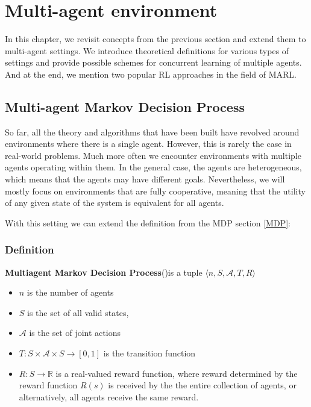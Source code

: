 \chapter{Multi-agent environment}

In this chapter, we revisit concepts from the previous section and extend them to multi-agent settings.
We introduce theoretical definitions for various types of settings and provide possible schemes for concurrent learning of multiple agents.
And at the end, we mention two popular RL approaches in the field of MARL.

\section{Multi-agent Markov Decision Process}
So far, all the theory and algorithms that have been built have revolved around environments where there is a single agent.
However, this is rarely the case in real-world problems.
Much more often we encounter environments with multiple agents operating within them.
In the general case, the agents are heterogeneous, which means that the agents may have different goals.
Nevertheless, we will mostly focus on environments that are fully cooperative, meaning that the utility of any given state of the system is equivalent for all agents.

With this setting we can extend the definition from the MDP section \ref{MDP}:
\subsection*{Definition}
\textbf{Multiagent Markov Decision Process}(\cite{MMDP})is a tuple 
$\langle n, S, \mathcal{A}, T, R\rangle$
\begin{itemize}
    \item $n$ is the number of agents
    \item $S$ is the set of all valid states,
    \item $\mathcal{A} $ is the set of joint actions
    \item $T: S \times \mathcal{A} \times S \rightarrow [0,1]$ is the transition function
    \item $R: S  \rightarrow \mathbb{R}$ is a real-valued reward function, where reward determined by the reward function $R(s)$ is received by the the entire collection of agents, or alternatively, all agents receive the same reward.

\end{itemize}

